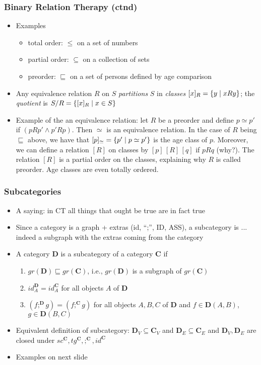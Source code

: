 \documentclass[handout]{beamer}
\newcommand{\bfsf}[1]{{\boldsymbol{#1}}}
\newcommand{\CC}{\bfsf{C}}
\newcommand{\DD}{\bfsf{D}}
\begin{document}
\frame
  {
    
    \frametitle{Binary Relation Therapy (ctnd)}\label{Ch2:BinRelsCtnd}

 \begin{itemize}[<+->]\label{right-left-invariance}
    \item Examples
    \begin{itemize}[<+->]
    \item total order: $\leq$ on a set of numbers
    \item partial order: $\subseteq$ on a collection of  sets 
    \item preorder: $\sqsubseteq$ on a set of persons defined by age comparison
    \end{itemize}
    \item Any equivalence relation $R$ on $S$ \emph{partitions} $S$ 
    in \emph{classes} $[x]_R = \{y \mid xRy\}$; 
    the \emph{quotient} is $S/R = \{[x]_R \mid x\in S\}$
    \item Example of the an equivalence relation: let $R$ be a preorder
and define $p\simeq p'$ if $(p R p' \wedge p' R p)$. Then $\simeq$ is an equivalence
relation. In the case of $R$ being ${\sqsubseteq}$ above, we have that  
$[p]_\simeq = \{p' \mid p\simeq p'\}$  is the age class of $p$. Moreover,
we can define a relation $[R]$ on classes by $[p]\,[R]\, [q] $ if $pRq$ (why?).
The relation $[R]$ is a partial order on the classes, 
explaining why $R$ is called preorder. Age classes are even totally ordered.
 \end{itemize}

}

\frame
  {   
    \frametitle{Subcategories}\label{Ch2:Subcategories}

 \begin{itemize}[<+->]
\item A saying: in CT all things that ought be true are in fact true
\item Since a category is a graph + extras (id, ``;'', ID, ASS), a subcategory is ...
indeed a subgraph with the extras coming from the category
\item A category $\DD$ is  a subcategory of a category $\CC$ if 
   \begin{enumerate}[<+->]
\item $gr(\DD) \sqsubseteq gr(\CC)$, i.e., $gr(\DD)$ is a subgraph of $gr(\CC)$
\item $id^\DD_A =  id^\CC_A$ for all objects $A$ of $\DD$
\item $(f;^\DD g) =(f;^\CC g)$ for all  objects $A,B,C$ of $\DD$ and $f\in\DD(A,B)$, $g\in\DD(B,C)$
   \end{enumerate}
\item Equivalent definition of subcategory:
$\DD_V\subseteq \CC_V$ and $\DD_E\subseteq \CC_E$  and $\DD_V,\DD_E$
are closed under $sc^\CC,tg^\CC, ;^\CC, id^\CC$
\item Examples on next slide
 \end{itemize}

 }
\end{document}
